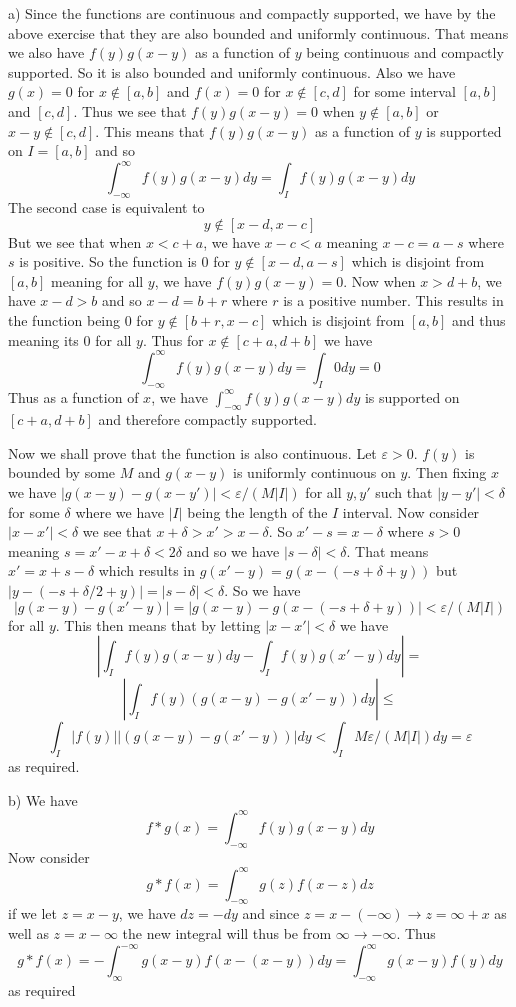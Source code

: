 \documentclass[12pt]{article}
\begin{document}
a) Since the functions are continuous and compactly supported, we have by the above exercise that they are also bounded and uniformly continuous. That means we also have $ f(y)g(x-y)$ as a function of $y$ being continuous and compactly supported. So it is also bounded and uniformly continuous. Also we have $g(x) = 0$ for $x\notin[a,b]$ and $ f(x) = 0 $ for $x\notin[c,d]$ for some interval $[a,b]$ and $[c,d]$. Thus we see that $f(y)g(x-y) = 0$ when $ y\notin[a,b]$ or $x-y\notin[c,d]$. This means that $f(y)g(x-y)$ as a function of $y$ is supported on $I = [a,b]$ and so \[\int_{-\infty}^\infty f(y)g(x-y)dy = \int_If(y)g(x-y)dy \] The second case is equivalent to 
\[y\notin[x-d,x-c]\] But we see that when $ x <c+a$, we have $x-c < a$ meaning $x-c = a-s$ where $s$ is positive. So the function is 0 for $y\notin[x-d, a-s]$ which is disjoint from $[a,b]$ meaning for all $y$, we have $f(y)g(x-y) = 0$. Now when $ x> d+b$, we have $ x-d>b$ and so $x-d = b+r$ where $r$ is a positive number. This results in the function being $0$ for $y\notin[b+r, x-c]$ which is disjoint from $[a,b]$ and thus meaning its $0$ for all $y$. Thus for $ x\notin[c+a,d+b]$ we have
\[\int_{-\infty}^\infty f(y)g(x-y)dy =\int_I 0dy = 0 \] Thus as a function of $ x$, we have $\int_{-\infty}^\infty f(y)g(x-y)dy$ is supported on $[c+a,d+b]$ and therefore compactly supported.

Now we shall prove that the function is also continuous. Let $\varepsilon>0$. $f(y)$ is bounded by some $M$ and $g(x-y)$ is uniformly continuous on $y$. Then fixing $x$ we have $|g(x-y)-g(x-y')| < \varepsilon/(M|I|)$ for all $y,y'$ such that $|y-y'| < \delta$ for some $\delta$ where we have $|I|$ being the length of the $I$ interval. Now consider $|x-x'|< \delta$ we see that $x+\delta>x'>x-\delta$. So $ x'-s = x-\delta$ where $s>0$ meaning $ s = x'-x+\delta <2\delta $ and so we have $ |s-\delta|< \delta$. That means $x' = x+s-\delta$ which results in $g(x'-y) = g(x-(-s+\delta+y)) $ but $|y -(-s+\delta/2+y)| = |s-\delta| < \delta $. So we have 
\[|g(x-y) -g(x'-y)| =|g(x-y) -g(x-(-s+\delta+y))| < \varepsilon/(M|I|) \] for all $y$. This then means that by letting $ |x-x'|< \delta$ we have
\[\left|\int_I f(y)g(x-y)dy -\int_I f(y)g(x'-y)dy\right|=\] \[\left|\int_I f(y)(g(x-y)-g(x'-y))dy\right| \leq \] \[  \int_I |f(y)||(g(x-y)-g(x'-y))|dy < \int_I M\varepsilon/(M|I|)dy =\varepsilon\] as required.

b) We have
\[f * g(x) = \int_{-\infty}^\infty f(y)g(x-y) dy  \]
Now consider 
\[g*f(x) = \int_{-\infty}^\infty g(z)f(x-z) dz  \] if we let $ z = x-y$, we have $dz = -dy$ and since $ z=x-(-\infty)\rightarrow z=\infty+x  $ as well as $z = x - \infty $ the new integral will thus be from $ \infty \to -\infty$. Thus
\[g*f(x) =-\int_{\infty}^{-\infty} g(x-y)f(x-(x-y))dy =\int_{-\infty}^\infty g(x-y)f(y)dy  \] as required
\end{document}

